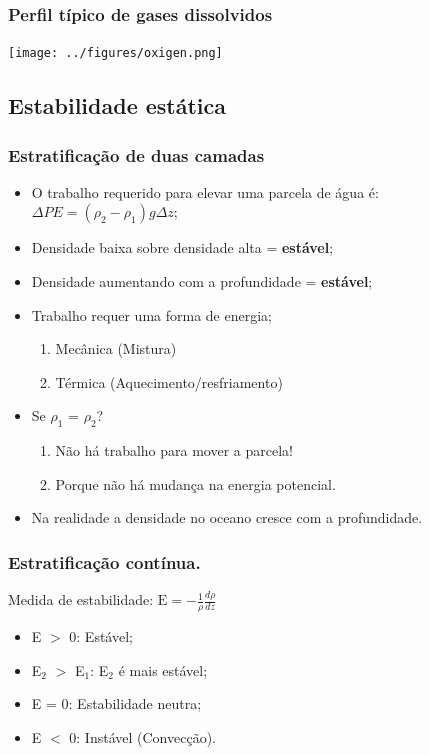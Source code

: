 \begin{frame}
\frametitle{Perfil típico de gases dissolvidos}
    \begin{center}
        \texttt{[image: ../figures/oxigen.png]}
    \end{center}
\end{frame}


\subsection{Estabilidade estática}
\begin{frame}
\frametitle{Estratificação de duas camadas}
\footnotesize{
  \begin{itemize}[<+-| alert@+>]
    \item O trabalho requerido para elevar uma parcela de água é:
          $\Delta PE = (\rho_2 - \rho_1)g\Delta z$;
    \item Densidade baixa sobre densidade alta = {\bf estável};
    \item Densidade aumentando com a profundidade = {\bf estável};
    \item Trabalho requer uma forma de energia;
    \pause
      \begin{enumerate}[<+-| alert@+>]
        \item Mecânica (Mistura)
        \item Térmica (Aquecimento/resfriamento)
      \end{enumerate}
    \item Se $\rho_1$ = $\rho_2$?
    \pause
      \begin{enumerate}[<+-| alert@+>]
        \item Não há trabalho para mover a parcela!
        \item Porque não há mudança na energia potencial.
      \end{enumerate}
    \item Na realidade a densidade no oceano cresce com a profundidade.
  \end{itemize}
  }
\end{frame}

\begin{frame}
\frametitle{Estratificação contínua.}
  \begin{block}{}
  Medida de estabilidade: $\text{E} = -\frac{1}{\rho}\frac{d\rho}{dz}$
  \end{block}
  \pause
  \begin{itemize}[<+-| alert@+>]
    \item E $>$ 0: Estável;
    \item E$_2$ $>$ E$_1$: E$_2$ é mais estável;
    \item E = 0: Estabilidade neutra;
    \item E $<$ 0: Instável (Convecção).
  \end{itemize}
\end{frame}

